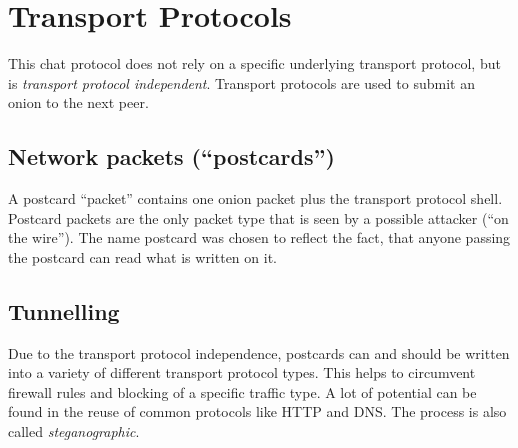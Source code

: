 \section{Transport Protocols}
This chat protocol does not rely on a specific underlying transport protocol,
but is \textit{transport protocol independent}. 
Transport protocols are used to submit an onion to the next peer.

\subsection{Network packets ("`postcards"')}
\label{eofpostcard}
A postcard "`packet"' contains one onion packet plus the transport protocol
shell. Postcard packets are the only packet type that is seen by a possible
attacker ("`on the wire"'). 
The name postcard was chosen to reflect the fact, that anyone
passing the postcard can read what is written on it.
\subsection{Tunnelling}
\label{tunneling}
Due to the transport protocol independence, postcards can and should
be written into a variety of different transport protocol types.
This helps to circumvent firewall rules and blocking of a specific
traffic type. A lot of potential can be found in the reuse of
common protocols like HTTP and DNS.\cite{rfc1034, rfc1035, rfc2616}
The process is also called \textit{steganographic}.
